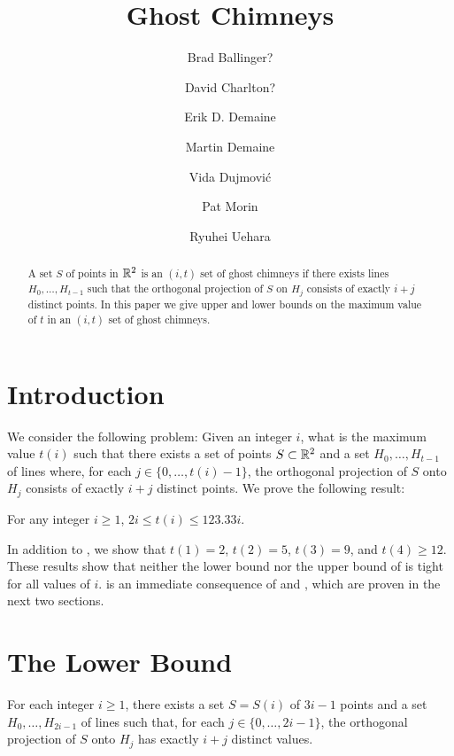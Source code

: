 \documentclass{cccg10}
\title{Ghost Chimneys}
\author{Brad Ballinger?
	\and David Charlton?
	\and Erik D. Demaine 
	\and Martin Demaine
	\and Vida Dujmovi\'c
	\and Pat Morin
	\and Ryuhei Uehara}
\begin{document}
\maketitle

\begin{abstract}
A set $S$ of points in $\mathbb{R}^2$ is an $(i,t)$ set of ghost chimneys
if there exists lines $H_0,\ldots,H_{t-1}$ such that the orthogonal
projection of $S$ on $H_j$ consists of exactly $i+j$ distinct points.
In this paper we give upper and lower bounds on the maximum value of $t$
in an $(i,t)$ set of ghost chimneys.
\end{abstract}

\section{Introduction}

We consider the following problem:  Given an integer $i$, what
is the maximum value $t(i)$ such that there exists a set of points
$S\subset\mathbb{R}^2$ and a set $H_0,\ldots,H_{t-1}$ of lines where, for each
$j\in\{0,\ldots,t(i)-1\}$, the orthogonal projection of $S$ onto $H_j$
consists of exactly $i+j$ distinct points.  We prove the following result:

\begin{thm}
For any integer $i\ge 1$,  $2i \le t(i) \le 123.33i$.
\end{thm}

In addition to , we show that $t(1)=2$, $t(2)=5$, $t(3)=9$,
and $t(4)\ge 12$.  These results show that neither the lower bound
nor the upper bound of  is tight for all values of $i$.
 is an immediate consequence of  and
, which are proven in the next two sections.

\section{The Lower Bound}

\begin{lem}
For each integer $i\ge 1$, there exists a set $S=S(i)$ of $3i-1$
points and a set $H_0,\ldots,H_{2i-1}$ of lines such that, for each
$j\in\{0,\ldots,2i-1\}$, the orthogonal projection of $S$ onto $H_j$
has exactly $i+j$ distinct values.
\end{lem}
\end{document}
